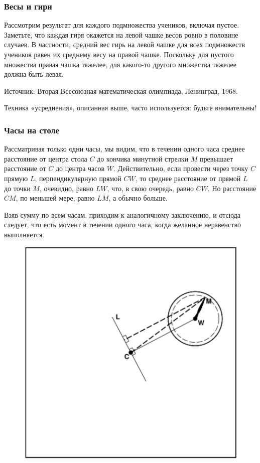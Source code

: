 \subsubsection*{Весы и гири} %

Рассмотрим результат для каждого подмножества учеников, включая пустое.
Заметьте, что каждая гиря окажется на левой чашке весов ровно в половине случаев.
В частности, средний вес гирь на левой чашке для всех подмножеств учеников равен их среднему весу на правой чашке.
Поскольку для пустого множества правая чашка тяжелее, 
для какого-то другого множества тяжелее должна быть левая.\heart

Источник: Вторая Всесоюзная математическая олимпиада, Ленинград, 1968.

Техника «усреднения», описанная выше, часто используется: будьте внимательны!

\subsubsection*{Часы на столе} %

Рассматривая только одни часы, 
мы видим, что в течении одного часа среднее расстояние от центра стола $C$ до кончика минутной стрелки $M$ превышает расстояние от $C$ до центра часов $W$.
Действительно, если провести через точку $C$ прямую $L$, перпендикулярную прямой $CW$, 
то среднее расстояние от прямой $L$ до точки $M$, очевидно, равно $LW$, 
что, в свою очередь, равно $CW$.
Но расстояние $CM$, по меньшей мере, равно $LM$, а обычно больше.

Взяв сумму по всем часам, приходим к аналогичному заключению, и отсюда следует, что есть момент в течении одного часа, когда желанное неравенство выполняется.\heart

\begin{figure}[h!]
\centering
\includegraphics[scale=0.9]{Figs/Insight/watch}
\end{figure}

